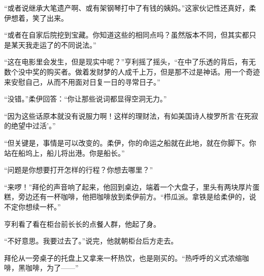“或者说继承大笔遗产啊、或有架钢琴打中了有钱的姨妈。”这家伙记性还真好，柔伊想着，笑了出来。

“或者在自家后院挖到宝藏。你知道这些的相同点吗？虽然版本不同，但其实都只是某天我走运了的不同说法。”

“这在电影里会发生，但是现实中呢？”亨利摇了摇头，“在中了乐透的背后，有无数个没中奖的购买者。做着发财梦的人成千上万，但是那不过是神话。用一个奇迹来安慰自己，从而不用面对日复一日的寻常日子。”

“没错。”柔伊回答：“你让那些说词都显得空洞无力。”

“因为这些话原本就没有说服力啊！这样的理财法，有如美国诗人梭罗所言‘在死寂的绝望中过活’。”

“但关键是，事情是可以改变的。柔伊，你的命运之船就在此地，就在你脚下。你站在船坞上，船儿将出港。你是船长。”

“问题是你想要打开怎样的行程？你想去哪里？”

“来啰！”拜伦的声音响了起来，他回到桌边，端着一个大盘子，里头有两块厚片蛋糕，旁边还有一杯咖啡，他把咖啡放到柔伊前方。“栉瓜派。拿铁是给柔伊的，说不定你想续一杯。”

亨利看了看在柜台前长长的点餐人群，他起了身。

“不好意思。我要过去了。”说完，他就朝柜台后方走去。

拜伦从一旁桌子的托盘上又拿来一杯热饮，也是刚买的。“热呼呼的义式浓缩咖啡，黑咖啡，为了——”
